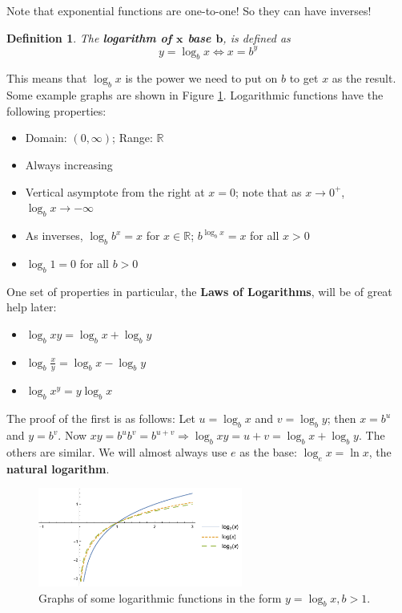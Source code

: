 \documentclass[letterpaper, 11pt, openany]{book}
\theoremstyle{mytheoremstyle}
\newtheorem{definition}{Definition}[section]
\theoremstyle{myexamplestyle}
\begin{document}
Note that exponential functions are one-to-one! So they can have inverses!
\begin{definition}
    The \textbf{logarithm of \(\bm{x}\) base \(\bm{b}\)}, is defined as 
    \[y = \log_{b} x \Leftrightarrow x = b^{y}\]
\end{definition}
This means that $\log_{b} x$ is the power we need to put on $b$ to get $x$ as the result. Some example graphs are shown in Figure \ref{f:logfunctions}. Logarithmic functions have the following properties:
\begin{itemize}
    \item Domain: $(0, \infty)$; Range: $\mathbb{R}$
    \item Always increasing
    \item Vertical asymptote from the right at $x = 0$; note that as $x \to 0^{+}$, $\log_{b} x \to -\infty$
    \item As inverses, $\log_{b} b^{x} = x$ for $x \in \mathbb{R}$; $b^{\log_{b} x} = x$ for all $x > 0$
    \item $\log_{b} 1 = 0$ for all $b > 0$
\end{itemize}
One set of properties in particular, the \textbf{Laws of Logarithms}, will be of great help later:
\begin{itemize}
    \item $\log_{b} xy = \log_{b} x + \log_{b} y$
    \item $\log_{b} \frac{x}{y} = \log_{b} x - \log_{b} y$
    \item $\log_{b} x^{y} = y \log_{b} x$
\end{itemize}
The proof of the first is as follows: Let $u = \log_{b} x$ and $v = \log_{b} y$; then $x = b^{u}$ and $y = b^{v}$. Now $xy = b^{u}b^{v} = b^{u + v} \Rightarrow \log_{b} xy = u + v = \log_{b} x + \log_{b} y$. The others are similar.
We will almost always use $e$ as the base: $\log_{e} x = \ln x$, the \textbf{natural logarithm}.

\begin{figure}[htbp]
    \centering
        \includegraphics[width = 0.6\textwidth]{Figures/logfunctions.pdf}
    \caption{Graphs of some logarithmic functions in the form $y = \log_{b} x,b > 1$.}
    \label{f:logfunctions}
\end{figure}
\end{document}
